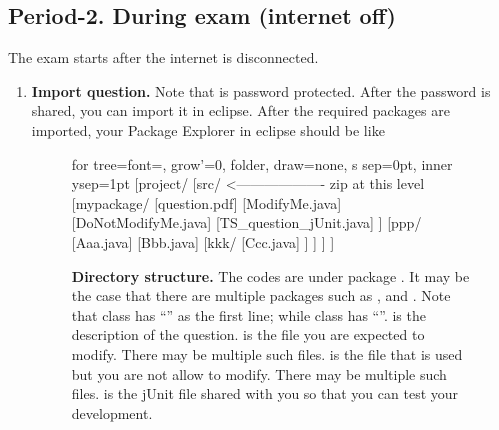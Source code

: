 \subsection{Period-2. During exam (internet oﬀ)}

The exam starts after the internet is disconnected.

\begin{enumerate}[label=\roman*.]  
	
	\item \textbf{Import question.}
	Note that  is password protected. 
	After the password is shared, you can import it in eclipse. 
	After the required packages are imported, 
	your Package Explorer in eclipse should be like 
	





\begin{figure}[htbp]
\begin{center}
	\begin{forest}
	for tree={font=\ttfamily, grow'=0, folder, draw=none,
	          s sep=0pt,        %
	          inner ysep=1pt}   %
		[project/
			[src/                     <------------------- zip at this level
				[mypackage/ 
					[question.pdf] 
					[ModifyMe.java] 
					[DoNotModifyMe.java] 
					[TS\_question\_jUnit.java]
				]
				[ppp/ 
					[Aaa.java] 
					[Bbb.java]
					[kkk/
						[Ccc.java]
					] 
				]
			]
		]
	\end{forest}

	\caption{\small
		\textbf{Directory structure.}
		The codes are under package .
		It may be the case that there are multiple packages 
		such as  ,  and .
		Note that class  has 
		``''
		as the first line;
		while class  has 
		``''.
		 is the description of the question.
		 is the file you are expected to modify.
		There may be multiple such files.
		 is the file that is used but 
		you are not allow to modify.
		There may be multiple such files.
		 is the jUnit file shared with you 
		so that you can test your development.
	}
	\label{fig:DirectoryStructure}
\end{center}
\end{figure}
	

\end{enumerate}
